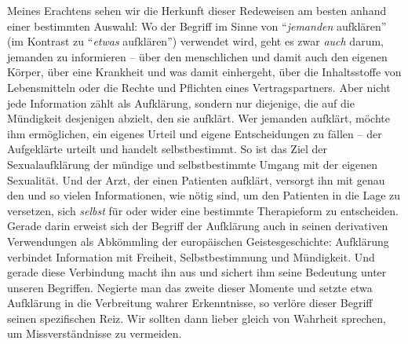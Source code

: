 Meines Erachtens sehen wir die Herkunft dieser Redeweisen am besten anhand einer
bestimmten Auswahl: Wo der Begriff im Sinne von \enquote{\emph{jemanden}
aufklären} (im Kontrast zu \enquote{\emph{etwas} aufklären}) verwendet wird,
geht es zwar \emph{auch} darum, jemanden zu informieren -- über den menschlichen
und damit auch den eigenen Körper, über eine Krankheit und was damit einhergeht,
über die In\-halts\-stof\-fe von Lebensmitteln oder die Rechte und Pflichten
eines Vertragspartners. Aber nicht jede Information zählt als Aufklärung,
sondern nur diejenige, die auf die Mündigkeit desjenigen abzielt, den sie
aufklärt. Wer jemanden aufklärt, möchte ihm ermöglichen, ein eigenes Urteil und
eigene Entscheidungen zu fällen -- der Aufgeklärte urteilt und handelt
selbstbestimmt.
So ist das Ziel der Sexualaufklärung der mündige und selbstbestimmte Umgang mit der eigenen
Sexualität. Und der Arzt, der einen Patienten aufklärt, versorgt ihn mit genau
den und so vielen Informationen, wie nötig sind, um den Patienten in die Lage zu
versetzen, sich \emph{selbst} für oder wider eine bestimmte Therapieform zu
entscheiden. Gerade darin erweist sich der Begriff der Aufklärung auch in seinen
derivativen Verwendungen als Abkömmling der europäischen Geistesgeschichte:
Aufklärung verbindet Information mit Freiheit, Selbstbestimmung und Mündigkeit.
Und gerade diese Verbindung macht ihn aus und sichert ihm seine Bedeutung unter
unseren Begriffen. Negierte man das zweite dieser Momente und setzte etwa
Aufklärung in die Verbreitung wahrer Erkenntnisse, so verlöre dieser Begriff
seinen spezifischen Reiz. Wir sollten dann lieber gleich von Wahrheit sprechen,
um Missverständnisse zu vermeiden.

